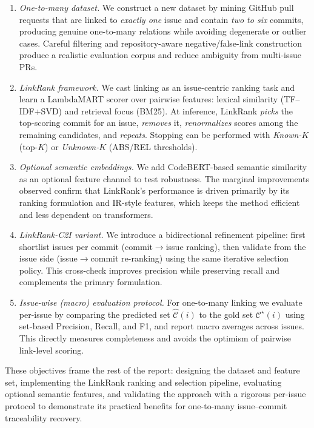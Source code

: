 \begin{enumerate}
	\item \textit{One-to-many dataset.} We construct a new dataset by mining GitHub pull requests that are linked to \emph{exactly one} issue and contain \emph{two to six} commits, producing genuine one-to-many relations while avoiding degenerate or outlier cases. Careful filtering and repository-aware negative/false-link construction produce a realistic evaluation corpus and reduce ambiguity from multi-issue PRs.

	\item \textit{LinkRank framework.} We cast linking as an issue-centric ranking task and learn a LambdaMART scorer over pairwise features: lexical similarity (TF--IDF{+}SVD) and retrieval focus (BM25). At inference, LinkRank \emph{picks} the top-scoring commit for an issue, \emph{removes} it, \emph{renormalizes} scores among the remaining candidates, and \emph{repeats}. Stopping can be performed with \emph{Known-$K$} (top-$K$) or \emph{Unknown-$K$} (ABS/REL thresholds).

	\item \textit{Optional semantic embeddings.} We add CodeBERT-based semantic similarity as an optional feature channel to test robustness. The marginal improvements observed confirm that LinkRank’s performance is driven primarily by its ranking formulation and IR-style features, which keeps the method efficient and less dependent on transformers.

	\item \textit{LinkRank-C2I variant.} We introduce a bidirectional refinement pipeline: first shortlist issues per commit (commit$\rightarrow$issue ranking), then validate from the issue side (issue$\rightarrow$commit re-ranking) using the same iterative selection policy. This cross-check improves precision while preserving recall and complements the primary formulation.

	\item \textit{Issue-wise (macro) evaluation protocol.} For one-to-many linking we evaluate per-issue by comparing the predicted set $\widehat{\mathcal{C}}(i)$ to the gold set $\mathcal{C}^\star(i)$ using set-based Precision, Recall, and F1, and report macro averages across issues. This directly measures completeness and avoids the optimism of pairwise link-level scoring.
\end{enumerate}

These objectives frame the rest of the report: designing the dataset and feature set, implementing the LinkRank ranking and selection pipeline, evaluating optional semantic features, and validating the approach with a rigorous per-issue protocol to demonstrate its practical benefits for one-to-many issue--commit traceability recovery.






